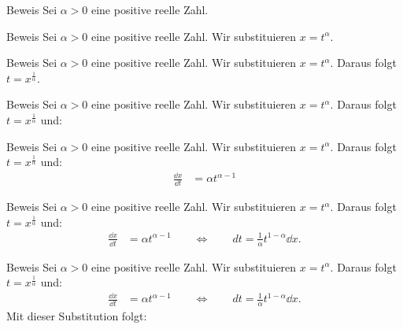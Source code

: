 \documentclass[10pt]{beamer}
\begin{document}
\begin{frame}{Beweis}
    Sei \( \alpha > 0 \) eine positive reelle Zahl.
\end{frame}



\begin{frame}{Beweis}
    Sei \( \alpha > 0 \) eine positive reelle Zahl. Wir substituieren \( x = t^{\alpha} \).
\end{frame}



\begin{frame}{Beweis}
    Sei \( \alpha > 0 \) eine positive reelle Zahl. Wir substituieren \( x = t^{\alpha} \). Daraus folgt \( t = x^{\frac{1}{\alpha}} \).
\end{frame}



\begin{frame}{Beweis}
    Sei \( \alpha > 0 \) eine positive reelle Zahl. Wir substituieren \( x = t^{\alpha} \). Daraus folgt \( t = x^{\frac{1}{\alpha}} \) und:
\end{frame}



\begin{frame}{Beweis}
    Sei \( \alpha > 0 \) eine positive reelle Zahl. Wir substituieren \( x = t^{\alpha} \). Daraus folgt \( t = x^{\frac{1}{\alpha}} \) und:
    \begin{align*}
        \frac{\dd{x}}{\dd{t}}
        & = \alpha t^{\alpha - 1}
    \end{align*}
\end{frame}



\begin{frame}{Beweis}
    Sei \( \alpha > 0 \) eine positive reelle Zahl. Wir substituieren \( x = t^{\alpha} \). Daraus folgt \( t = x^{\frac{1}{\alpha}} \) und:
    \begin{align*}
        \frac{\dd{x}}{\dd{t}}
        & = \alpha t^{\alpha - 1}
        \quad\quad \Leftrightarrow \quad\quad dt = \frac{1}{\alpha} t^{1 - \alpha} \dd{x}.
    \end{align*}
\end{frame}



\begin{frame}{Beweis}
    Sei \( \alpha > 0 \) eine positive reelle Zahl. Wir substituieren \( x = t^{\alpha} \). Daraus folgt \( t = x^{\frac{1}{\alpha}} \) und:
    \begin{align*}
        \frac{\dd{x}}{\dd{t}}
        & = \alpha t^{\alpha - 1}
        \quad\quad \Leftrightarrow \quad\quad dt = \frac{1}{\alpha} t^{1 - \alpha} \dd{x}.
    \end{align*}
    Mit dieser Substitution folgt:
\end{frame}
\end{document}
